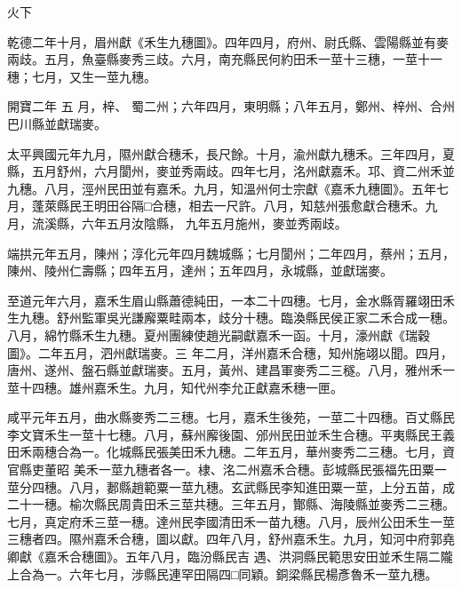 
\begin{pinyinscope}

 火下



 乾德二年十月，眉州獻《禾生九穗圖》。四年四月，府州、尉氏縣、雲陽縣並有麥兩歧。五月，魚臺縣麥秀三歧。六月，南充縣民何約田禾一莖十三穗，一莖十一穗；七月，又生一莖九穗。



 開寶二年
 五
 月，梓、
 蜀二州；六年四月，東明縣；八年五月，鄭州、梓州、合州巴川縣並獻瑞麥。



 太平興國元年九月，隰州獻合穗禾，長尺餘。十月，渝州獻九穗禾。三年四月，夏縣，五月舒州，六月閬州，麥並秀兩歧。四年七月，洺州獻嘉禾。邛、資二州禾並九穗。八月，涇州民田並有嘉禾。九月，知溫州何士宗獻《嘉禾九穗圖》。五年七月，蓬萊縣民王明田谷隔□合穗，相去一尺許。八月，知慈州張愈獻合穗禾。九月，流溪縣，六年五月汝陰縣，
 九年五月施州，麥並秀兩歧。



 端拱元年五月，陳州；淳化元年四月魏城縣；七月閬州；二年四月，蔡州；五月，陳州、陵州仁壽縣；四年五月，達州；五年四月，永城縣，並獻瑞麥。



 至道元年六月，嘉禾生眉山縣蕭德純田，一本二十四穗。七月，金水縣胥羅翊田禾生九穗。舒州監軍吳光謙廨粟畦兩本，歧分十穗。臨渙縣民侯正家二禾合成一穗。八月，綿竹縣禾生九穗。夏州團練使趙光嗣獻嘉禾一函。十月，濠州獻《瑞穀圖》。二年五月，泗州獻瑞麥。三
 年二月，洋州嘉禾合穗，知州施翊以聞。四月，唐州、遂州、盤石縣並獻瑞麥。五月，黃州、建昌軍麥秀二三穟。八月，雅州禾一莖十四穗。雄州嘉禾生。九月，知代州李允正獻嘉禾穗一匣。



 咸平元年五月，曲水縣麥秀二三穗。七月，嘉禾生後苑，一莖二十四穗。百丈縣民李文寶禾生一莖十七穗。八月，蘇州廨後園、邠州民田並禾生合穗。平夷縣民王義田禾兩穗合為一。化城縣民張美田禾九穗。二年五月，華州麥秀二三穗。七月，資官縣吏董昭
 美禾一莖九穗者各一。棣、洺二州嘉禾合穗。彭城縣民張福先田粟一莖分四穗。八月，郪縣趙範粟一莖九穗。玄武縣民李知進田粟一莖，上分五苗，成二十一穗。榆次縣民周貴田禾三莖共穗。三年五月，酇縣、海陵縣並麥秀二三穗。七月，真定府禾三莖一穗。達州民李國清田禾一苗九穗。八月，辰州公田禾生一莖三穗者四。隰州嘉禾合穗，圖以獻。四年八月，舒州嘉禾生。九月，知河中府郭堯卿獻《嘉禾合穗圖》。五年八月，臨汾縣民吉
 遇、洪洞縣民範思安田並禾生隔二隴上合為一。六年七月，涉縣民連罕田隔四□同穎。銅梁縣民楊彥魯禾一莖九穗。




\end{pinyinscope}
